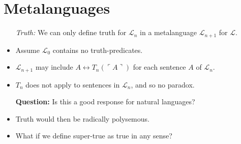 \documentclass[a4paper, 11pt]{article} %
\newcommand{\tuple}[1]{\langle#1\rangle} %
\newcommand{\corner}[1]{\ulcorner#1\urcorner} %
\renewcommand{\L}{\mathcal{L}}
\begin{document}
\section*{Metalanguages}

\begin{itemize}
  \item[\it Truth:] We can only define truth for $\L_{n}$ in a metalanguage $\L_{n+1}$ for $\L$.
    \item Assume $\L_0$ contains no truth-predicates.
    \item $\L_{n+1}$ may include $A \leftrightarrow T_n(\corner{A})$ for each sentence $A$ of $\L_n$.
    \item $T_n$ does not apply to sentences in $\L_n$, and so no paradox. 
  \item[\bf Question:] Is this a good response for natural languages?
    \item Truth would then be radically polysemous.
    \item What if we define super-true as true in any sense?
\end{itemize}
\end{document}
